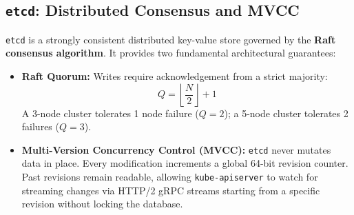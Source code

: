 \subsection{\texttt{etcd}: Distributed Consensus and MVCC}
\texttt{etcd} is a strongly consistent distributed key-value store governed by the \textbf{Raft consensus algorithm}. It provides two fundamental architectural guarantees:
\begin{itemize}[leftmargin=12pt]
  \item \textbf{Raft Quorum:} Writes require acknowledgement from a strict majority:
  \begin{equation}
  Q = \left\lfloor \frac{N}{2} \right\rfloor + 1
  \end{equation}
  A 3-node cluster tolerates 1 node failure ($Q = 2$); a 5-node cluster tolerates 2 failures ($Q = 3$).
  \item \textbf{Multi-Version Concurrency Control (MVCC):} \texttt{etcd} never mutates data in place. Every modification increments a global 64-bit revision counter. Past revisions remain readable, allowing \texttt{kube-apiserver} to watch for streaming changes via HTTP/2 gRPC streams starting from a specific revision without locking the database.
\end{itemize}

